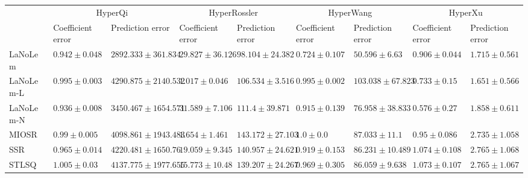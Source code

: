 \begin{table*}
{\begin{tabular}{lllllllll}
 & \multicolumn{2}{c}{HyperQi} & \multicolumn{2}{c}{HyperRossler} & \multicolumn{2}{c}{HyperWang} & \multicolumn{2}{c}{HyperXu} \\
 & Coefficient error & Prediction error & Coefficient error & Prediction error & Coefficient error & Prediction error & Coefficient error & Prediction error \\
\midrule
LaNoLem & $0.942\pm 0.048$ & $\mathbf{2892.333}\pm 361.834$ & $29.827\pm 36.126$ & $\mathbf{98.104}\pm 24.382$ & $\mathbf{0.724}\pm 0.107$ & $\mathbf{50.596}\pm 6.63$ & $0.906\pm 0.044$ & $1.715\pm 0.561$ \\
LaNoLem-L & $0.995\pm 0.003$ & $4290.875\pm 2140.532$ & $\mathbf{1.017}\pm 0.046$ & $106.534\pm 3.516$ & $0.995\pm 0.002$ & $103.038\pm 67.823$ & $0.733\pm 0.15$ & $\mathbf{1.651}\pm 0.566$ \\
LaNoLem-N & $\mathbf{0.936}\pm 0.008$ & $3450.467\pm 1654.571$ & $31.589\pm 7.106$ & $111.4\pm 39.871$ & $0.915\pm 0.139$ & $76.958\pm 38.833$ & $\mathbf{0.576}\pm 0.27$ & $1.858\pm 0.611$ \\
MIOSR & $0.99\pm 0.005$ & $4098.861\pm 1943.483$ & $1.654\pm 1.461$ & $143.172\pm 27.103$ & $1.0\pm 0.0$ & $87.033\pm 11.1$ & $0.95\pm 0.086$ & $2.735\pm 1.058$ \\
SSR & $0.965\pm 0.014$ & $4220.481\pm 1650.76$ & $19.059\pm 9.345$ & $140.957\pm 24.621$ & $0.919\pm 0.153$ & $86.231\pm 10.489$ & $1.074\pm 0.108$ & $2.765\pm 1.068$ \\
STLSQ & $1.005\pm 0.03$ & $4137.775\pm 1977.655$ & $15.773\pm 10.48$ & $139.207\pm 24.267$ & $0.969\pm 0.305$ & $86.059\pm 9.638$ & $1.073\pm 0.107$ & $2.765\pm 1.067$ \\

\midrule


\end{tabular}}
\end{table*}
